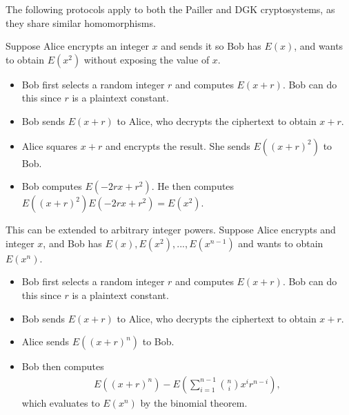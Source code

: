 The following protocols apply to both the Pailler and DGK cryptosystems, as they share similar homomorphisms.

Suppose Alice encrypts an integer $x$ and sends it so Bob has $E(x)$, and wants to obtain $E(x^2)$ without exposing the value of $x$.
\begin{itemize}
	\item Bob first selects a random integer $r$ and computes $E(x+r)$. Bob can do this since $r$ is a plaintext constant.
	\item Bob sends $E(x+r)$ to Alice, who decrypts the ciphertext to obtain $x+r$.
	\item Alice squares $x+r$ and encrypts the result. She sends $E((x+r)^2)$ to Bob.
	\item Bob computes $E(-2rx + r^2)$. He then computes $E((x+r)^2)E(-2rx + r^2) = E(x^2)$.
\end{itemize}

This can be extended to arbitrary integer powers.
Suppose Alice encrypts and integer $x$, and Bob has $E(x), E(x^2), ..., E(x^{n-1})$ and wants to obtain $E(x^n)$.
\begin{itemize}
	\item Bob first selects a random integer $r$ and computes $E(x+r)$. Bob can do this since $r$ is a plaintext constant.
	\item Bob sends $E(x+r)$ to Alice, who decrypts the ciphertext to obtain $x+r$.
	\item Alice sends $E((x+r)^n)$ to Bob.
	\item Bob then computes
	\begin{align*}
		E((x+r)^n) - E\left(\sum_{i=1}^{n-1}{\binom{n}{i}x^ir^{n-i}}\right),
	\end{align*}
	which evaluates to $E(x^n)$ by the binomial theorem.
\end{itemize}
